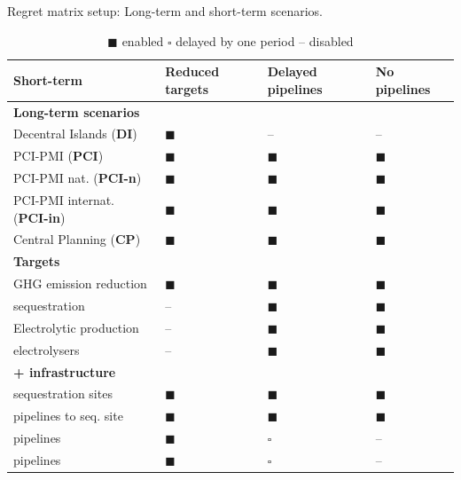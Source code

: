 \documentclass[preprint,12pt,sort&compress]{elsarticle}
\begin{document}
\begin{table}[htbp]
  \centering
  \caption{Regret matrix setup: Long-term and short-term scenarios.}
  \label{tab:regret_matrix_setup}
  \scriptsize
  \begin{tabularx}{\textwidth}{R{3.9cm}>{\centering\arraybackslash}X>{\centering\arraybackslash}X>{\centering\arraybackslash}X}
    \toprule
    \textbf{Short-term} & \textbf{Reduced targets} & \textbf{Delayed pipelines} & \textbf{No pipelines} \\
    \midrule
    \textbf{Long-term scenarios} & & & \\
    Decentral Islands (\textbf{DI}) & $\blacksquare$ & -- & -- \\
    PCI-PMI (\textbf{PCI}) & $\blacksquare$ & $\blacksquare$ & $\blacksquare$ \\
    PCI-PMI nat. (\textbf{PCI-n}) & $\blacksquare$ & $\blacksquare$ & $\blacksquare$\\
    PCI-PMI internat. (\textbf{PCI-in}) & $\blacksquare$ & $\blacksquare$ & $\blacksquare$ \\
    Central Planning (\textbf{CP}) & $\blacksquare$ & $\blacksquare$ & $\blacksquare$ \\
    \midrule
    \textbf{Targets} & & & \\
    GHG emission reduction &  $\blacksquare$ &  $\blacksquare$ &  $\blacksquare$ \\
     sequestration &  -- &  $\blacksquare$ &  $\blacksquare$ \\
    Electrolytic  production &  -- &  $\blacksquare$ &  $\blacksquare$ \\
     electrolysers &  -- &  $\blacksquare$ &  $\blacksquare$ \\
    \midrule
    \textbf{ +  infrastructure} & & & \\
     sequestration sites & $\blacksquare$ &  $\blacksquare$ &  $\blacksquare$ \\
     pipelines to seq. site & $\blacksquare$ &  $\blacksquare$ &  $\blacksquare$ \\
     pipelines & $\blacksquare$ &  $\square$ &  -- \\
     pipelines & $\blacksquare$ &  $\square$ &  -- \\
    \bottomrule
  \end{tabularx}
  \caption*{\scriptsize $\blacksquare$ enabled \quad $\square$ delayed by one period \quad -- disabled}
\end{table}
\end{document}
